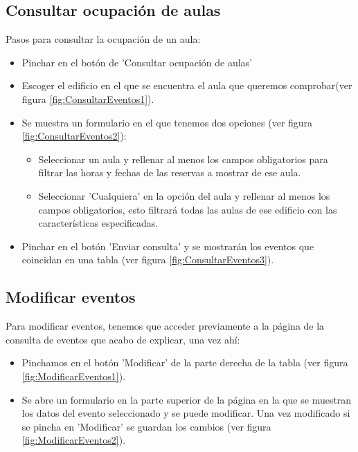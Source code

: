 \subsection{Consultar ocupación de aulas}
Pasos para consultar la ocupación de un aula:
\begin{itemize}
    \item Pinchar en el botón de 'Consultar ocupación de aulas'
    \item Escoger el edificio en el que se encuentra el aula que queremos comprobar(ver figura \ref{fig:ConsultarEventos1}).
    \item Se muestra un formulario en el que tenemos dos opciones (ver figura \ref{fig:ConsultarEventos2}):
    \begin{itemize}
        \item Seleccionar un aula y rellenar al menos los campos obligatorios para filtrar las horas y fechas de las reservas a mostrar de ese aula.
        \item Seleccionar 'Cualquiera' en la opción del aula y rellenar al menos los campos obligatorios, esto filtrará todas las aulas de ese edificio con las características especificadas.
    \end{itemize}
    \item Pinchar en el botón 'Enviar consulta' y se mostrarán los eventos que coincidan en una tabla (ver figura \ref{fig:ConsultarEventos3}).
\end{itemize}

\subsection{Modificar eventos}
Para modificar eventos, tenemos que acceder previamente a la página de la consulta de eventos que acabo de explicar, una vez ahí:
\begin{itemize}
    \item Pinchamos en el botón 'Modificar' de la parte derecha de la tabla (ver figura \ref{fig:ModificarEventos1}).
    \item Se abre un formulario en la parte superior de la página en la que se muestran los datos del evento seleccionado y se puede modificar. Una vez modificado si se pincha en 'Modificar' se guardan los cambios (ver figura \ref{fig:ModificarEventos2}).
\end{itemize}

